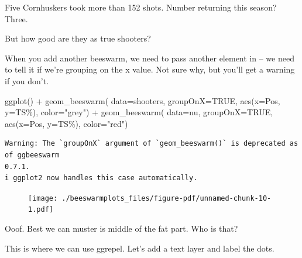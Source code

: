 \documentclass[
  letterpaper,
  DIV=11,
  numbers=noendperiod]{scrreprt}
\newenvironment{Shaded}{\begin{snugshade}}{\end{snugshade}}
\newcommand{\AttributeTok}[1]{\textcolor[rgb]{0.40,0.45,0.13}{#1}}
\newcommand{\ConstantTok}[1]{\textcolor[rgb]{0.56,0.35,0.01}{#1}}
\newcommand{\FunctionTok}[1]{\textcolor[rgb]{0.28,0.35,0.67}{#1}}
\newcommand{\NormalTok}[1]{\textcolor[rgb]{0.00,0.23,0.31}{#1}}
\newcommand{\SpecialCharTok}[1]{\textcolor[rgb]{0.37,0.37,0.37}{#1}}
\newcommand{\StringTok}[1]{\textcolor[rgb]{0.13,0.47,0.30}{#1}}
\begin{document}
Five Cornhuskers took more than 152 shots. Number returning this season?
Three.

But how good are they as true shooters?

When you add another beeswarm, we need to pass another element in -- we
need to tell it if we're grouping on the x value. Not sure why, but
you'll get a warning if you don't.

\begin{Shaded}
\begin{Highlighting}[]
\FunctionTok{ggplot}\NormalTok{() }\SpecialCharTok{+} 
  \FunctionTok{geom\_beeswarm}\NormalTok{(}
    \AttributeTok{data=}\NormalTok{shooters, }
    \AttributeTok{groupOnX=}\ConstantTok{TRUE}\NormalTok{, }
    \FunctionTok{aes}\NormalTok{(}\AttributeTok{x=}\NormalTok{Pos, }\AttributeTok{y=}\StringTok{\textasciigrave{}}\AttributeTok{TS\%}\StringTok{\textasciigrave{}}\NormalTok{), }\AttributeTok{color=}\StringTok{"grey"}\NormalTok{) }\SpecialCharTok{+} 
  \FunctionTok{geom\_beeswarm}\NormalTok{(}
    \AttributeTok{data=}\NormalTok{nu, }
    \AttributeTok{groupOnX=}\ConstantTok{TRUE}\NormalTok{, }
    \FunctionTok{aes}\NormalTok{(}\AttributeTok{x=}\NormalTok{Pos, }\AttributeTok{y=}\StringTok{\textasciigrave{}}\AttributeTok{TS\%}\StringTok{\textasciigrave{}}\NormalTok{), }\AttributeTok{color=}\StringTok{"red"}\NormalTok{)}
\end{Highlighting}
\end{Shaded}

\begin{verbatim}
Warning: The `groupOnX` argument of `geom_beeswarm()` is deprecated as of ggbeeswarm
0.7.1.
i ggplot2 now handles this case automatically.
\end{verbatim}

\begin{figure}[H]

{\centering \texttt{[image: ./beeswarmplots\_files/figure-pdf/unnamed-chunk-10-1.pdf]}

}

\end{figure}

Ooof. Best we can muster is middle of the fat part. Who is that?

This is where we can use ggrepel. Let's add a text layer and label the
dots.
\end{document}
